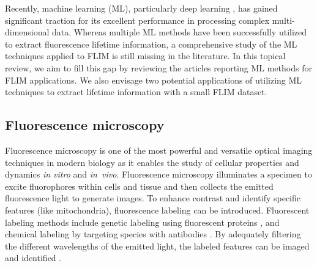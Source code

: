 \documentclass[12pt]{iopart}
\begin{document}
Recently, machine learning (ML), particularly deep learning \cite{goodfellow2016deep}, has gained significant traction for its excellent performance in processing complex multi-dimensional data. Whereas multiple ML methods have been successfully utilized to extract fluorescence lifetime information, a comprehensive study of the ML techniques applied to FLIM is still missing in the literature. In this topical review, we aim to fill this gap by reviewing the articles reporting ML methods for FLIM applications. We also envisage two potential applications of utilizing ML techniques to extract lifetime information with a small FLIM dataset.

\subsection{Fluorescence microscopy} \label{fm}
Fluorescence microscopy is one of the most powerful and versatile optical imaging techniques in modern biology as it enables the study of cellular properties and dynamics \textit{in vitro} and \textit{in~vivo}. Fluorescence microscopy illuminates a specimen to excite fluorophores within cells and tissue and then collects the emitted fluorescence light to generate images. To enhance contrast and identify specific features (like mitochondria), fluorescence labeling can be introduced. Fluorescent labeling methods include genetic labeling using fluorescent proteins \cite{proteins}, and chemical labeling by targeting species with antibodies \cite{FluorescentLabeling}. By adequately filtering the different wavelengths of the emitted light, the labeled features can be imaged and identified \cite{FluorescenceMicroscopy}.
\end{document}
